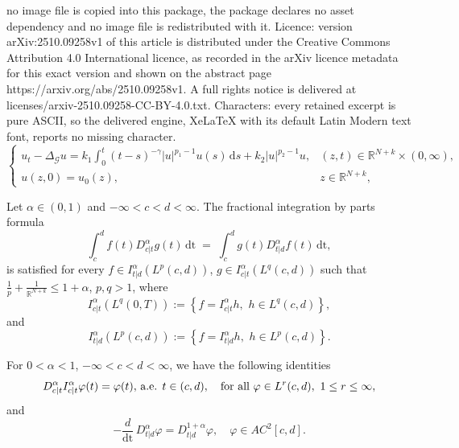 \documentclass[10pt,a4paper]{amsart}
\def\R{{\mathbb {R}}}
\newcommand{\abs}[1]{\lvert#1\rvert}
\begin{document}
no image file is copied into this package, the package declares no asset dependency and no image file is redistributed with it. Licence: version arXiv:2510.09258v1 of this article is distributed under the Creative Commons Attribution 4.0 International licence, as recorded in the arXiv licence metadata for this exact version and shown on the abstract page https://arxiv.org/abs/2510.09258v1. A full rights notice is delivered at licenses/arxiv-2510.09258-CC-BY-4.0.txt. Characters: every retained excerpt is pure ASCII, so the delivered engine, XeLaTeX with its default Latin Modern text font, reports no missing character.
\begin{equation}\label{*}
	\left\{\begin{array}{ll}
		\displaystyle {u_{t}-\Delta_{\mathcal{G}}
			u = k_1 \int_0^t(t-s)^{-\gamma}\abs{u}^{p_1-1}u(s)\,\mathrm{d}s} + k_2|u|^{p_2-1}u, &  (z,t)\in {\mathbb{R}}^{N+k}\times (0,\infty),\\
		\displaystyle{u(z,0)=  u_0(z),\qquad\qquad}&\displaystyle{z\in {\mathbb{R}}^{N+k},}
	\end{array}
	\right.
\end{equation}

\begin{proposition}
	Let $\alpha\in(0,1)$ and $-\infty<c<d<\infty$. The fractional integration by parts formula
	\begin{equation}\label{IP}
		\int_{c}^{d}f(t)D^\alpha_{c|t}g(t)\,\mathrm{dt} \;=\; \int_{c}^{d}
		g(t)D^\alpha_{t|d}f(t)\,\mathrm{dt},
	\end{equation}
	is satisfied for every $f\in I^\alpha_{t|d}(L^p(c,d))$, $g\in I^\alpha_{c|t}(L^q(c,d))$ such that $\frac{1}{p}+\frac{1}{\R^{N+k}}\leq 1+\alpha$, $p,q>1$, where
	\[
	I^\alpha_{c|t}(L^q(0,T)):=\left\{f= I^\alpha_{c|t}h,\,\, h\in L^q(c,d)\right\},
	\]
	and
	\[
	I^\alpha_{t|d}(L^p(c,d)):=\left\{f= I^\alpha_{t|d}h,\,\, h\in L^p(c,d)\right\}.
	\]
\end{proposition}

\begin{proposition}
	For $0<\alpha<1$, $-\infty<c<d<\infty$, we have the following identities
	\begin{equation}\label{Int3}
		D^\alpha_{c|t}I^\alpha_{c|t}\varphi(t)=\varphi(t),\,\hbox{a.e. $t\in(c,d)$}, \quad\hbox{for all}\,\,\varphi\in L^r(c,d),\,\, 1\leq r\leq\infty,
	\end{equation}
	and
	\begin{equation}\label{Int4}
		-\frac{d}{\mathrm{dt}} \, D^\alpha_{t|d}\varphi=D^{1+\alpha}_{t|d}\varphi,\quad \varphi\in AC^2[c,d].
	\end{equation}
\end{proposition}
\end{document}
